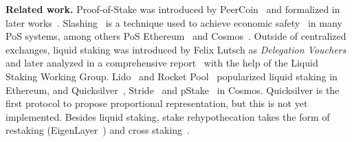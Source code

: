 \noindent
\textbf{Related work.}
Proof-of-Stake was introduced by PeerCoin~\cite{peercoin} and formalized
in later works~\cite{ouroboros,praos,ouroboros-genesis,algorand,DBLP:journals/iacr/BentovPS16a}.
Slashing~\cite{slashing} is a technique used to achieve economic safety~\cite{slashable-safety}
in many PoS systems, among others
PoS Ethereum~\cite{casper,buterin2020combining}
and Cosmos~\cite{2018tendermint,buchman2016tendermint,cosmossdk}.
Outside of centralized exchanges, liquid staking was introduced by Felix Lutsch
as \emph{Delegation Vouchers}~\cite{delegation-vouchers}
and later analyzed in a comprehensive report~\cite{liquid-staking-report} with
the help of the Liquid Staking Working Group.
Lido~\cite{lido} and Rocket Pool~\cite{rocket-pool} popularized liquid staking
in Ethereum, and Quicksilver~\cite{quicksilver}, Stride~\cite{stride} and
pStake~\cite{pstake} in Cosmos. Quicksilver is the first protocol to propose proportional
representation, but this is not yet implemented.
Besides liquid staking, stake rehypothecation takes the form of
restaking (EigenLayer~\cite{eigenlayer}) and cross staking~\cite{mesh-security}.
